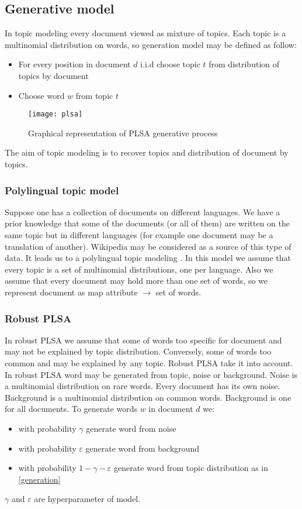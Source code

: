    \subsection{Generative model}
\label{generativeModel}
    In topic modeling every document viewed as mixture of topics. Each topic is a multinomial distribution on words,
    so generation model may be defined as follow:
    \begin{itemize} \label{generation}
	\item For every position in document $d$ i.i.d choose topic $t$ from distribution of topics by document
	\item Choose word $w$ from topic $t$
    \end{itemize}
    \begin{figure}[!ht]
	\caption{Graphical representation of PLSA generative process}
	\begin{minipage}{\textwidth}
	    \texttt{[image: plsa]}
	\end{minipage}
    \end{figure}
    The aim of topic modeling is to recover topics and distribution of document by topics.
    \subsubsection{Polylingual topic model}
	Suppose one has a collection of documents on different languages. We have a prior knowledge that some of the
	documents (or all of them) are written on the same topic but in different languages (for example one document may be a translation of another).
	Wikipedia may be considered as a source of this type of data. It leads us to a polylingual topic modeling \cite{polylingual}.
	In this model we assume that every topic is a set of multinomial distributions, one per language. Also we assume that
	every document may hold more than one set of words, so we represent document as map attribute $\to$ set of words.

    \subsubsection{Robust PLSA}
	In robust PLSA we assume that some of words too specific for document and may not be explained by topic
	distribution. Conversely, some of words too common and may be explained by any topic.
	Robust PLSA take it into account. In robust PLSA word may be generated from topic, noise or background.
	Noise is a multinomial distribution on rare words. Every document has its own noise.
	Background is a multinomial distribution on common words. Background is one for all documents.
	To generate words $w$  in document $d$ we:
	\begin{itemize}
	    \item with probability $\gamma$ generate word from noise
	    \item with probability $\varepsilon$ generate word from background
	    \item with probability $1 - \gamma - \varepsilon$ generate word from topic
		distribution as in \ref{generation}
	\end{itemize}
	$\gamma$ and $\varepsilon$ are hyperparameter of model.


